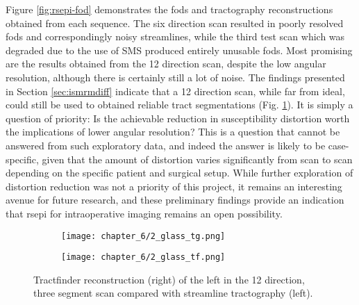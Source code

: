 Figure \ref{fig:rsepi-fod} demonstrates the \glspl{fod} and tractography reconstructions obtained from each sequence.
The six direction scan resulted in poorly resolved \glspl{fod} and correspondingly noisy streamlines, while the third test scan which was degraded due to the use of SMS produced entirely unusable \glspl{fod}.
Most promising are the results obtained from the 12 direction scan, despite the low angular resolution, although there is certainly still a lot of noise.
The findings presented in Section \ref{sec:ismrmdiff} indicate that a 12 direction scan, while far from ideal, could still be used to obtained reliable tract segmentations (Fig. \ref{fig:ssepi2}).
It is simply a question of priority:
Is the achievable reduction in susceptibility distortion worth the implications of lower angular resolution?
This is a question that cannot be answered from such exploratory data, and indeed the answer is likely to be case-specific, given that the amount of distortion varies significantly from scan to scan depending on the specific patient and surgical setup.
While further exploration of distortion reduction was not a priority of this project, it remains an interesting avenue for future research, and these preliminary findings provide an indication that \gls{rsepi} for intraoperative imaging remains an open possibility.

\begin{figure}[hbt!]
  \centering
  \begin{subfigure}{0.4\textwidth}
    \texttt{[image: chapter\_6/2\_glass\_tg.png]}
  \end{subfigure}%
  \begin{subfigure}{0.4\textwidth}
    \texttt{[image: chapter\_6/2\_glass\_tf.png]}
  \end{subfigure}
  \caption[RS-EPI 12 direction test scan CST reconstructions with tractography and tractfinder]{Tractfinder reconstruction (right) of the left  in the 12 direction, three segment  scan compared with streamline tractography (left).}
  \label{fig:ssepi2}
\end{figure}
